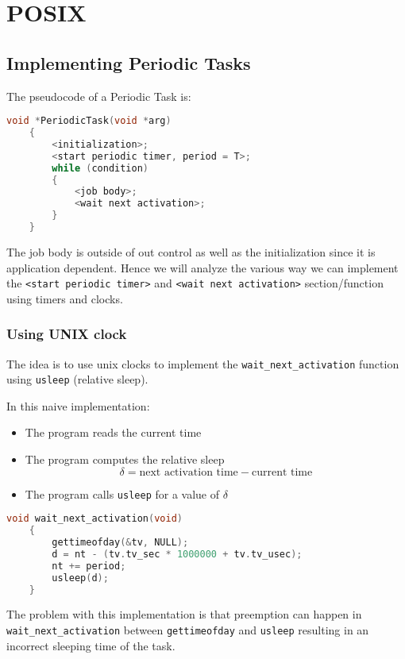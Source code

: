 \chapter{POSIX}
\section{Implementing Periodic Tasks}
The pseudocode of a Periodic Task is:
\begin{lstlisting}[language=C]
    void *PeriodicTask(void *arg)
    {
        <initialization>;
        <start periodic timer, period = T>;
        while (condition)
        {
            <job body>;
            <wait next activation>;
        }
    }
\end{lstlisting}

The job body is outside of out control as well as the initialization since it is application dependent. Hence we will analyze the various way we can implement the \texttt{<start periodic timer>} and \texttt{<wait next activation>} section/function using timers and clocks.

\subsection{Using UNIX clock}

The idea is to use unix clocks to implement the \texttt{wait\_next\_activation} function using \texttt{usleep} (relative sleep).

In this naive implementation:
\begin{itemize}
    \item The program reads the current time
    \item The program computes the relative sleep
    \[\delta = \text{next activation time} - \text{current time}\]
    \item The program calls \texttt{usleep} for a value of $\delta$
\end{itemize}

\begin{lstlisting}[language=C]
    void wait_next_activation(void)
    {
        gettimeofday(&tv, NULL);
        d = nt - (tv.tv_sec * 1000000 + tv.tv_usec);
        nt += period;
        usleep(d);
    }
\end{lstlisting}

The problem with this implementation is that preemption can happen in \texttt{wait\_next\_activation} between \texttt{gettimeofday} and \texttt{usleep} resulting in an incorrect sleeping time of the task.

